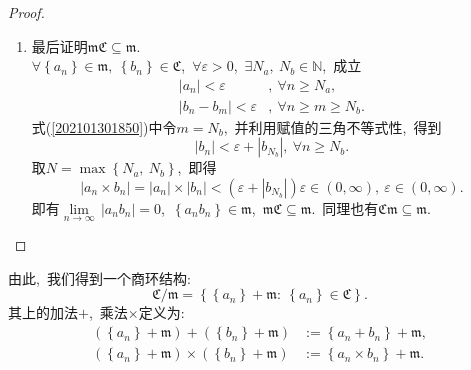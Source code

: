 \documentclass[UTF8, twoside]{ctexart}
\theoremstyle{nonumberplain}
\newtheorem{proof}{\heiti 证明}  %
\theoremstyle{nonumberplain}
\theoremstyle{plain}
\begin{document}
\begin{proof}
\begin{enumerate}
			\item 最后证明$\mathfrak{m}\mathfrak{C}\subseteq \mathfrak{m}$.\ \\
			$\forall \left\{ {{a}_{n}} \right\}\in \mathfrak{m},\ \left\{ {{b}_{n}} \right\}\in \mathfrak{C}$,\ $\forall \varepsilon >0$,\ $\exists {{N}_{a}},\ {{N}_{b}}\in \mathbb{N}$,\ 成立
			\begin{subequations}
				\begin{align}
					\left| {{a}_{n}} \right|<\varepsilon &,\ \forall n\ge {{N}_{a}}, \\ 
					\left| {{b}_{n}}-{{b}_{m}} \right|<\varepsilon &,\ \forall n\ge m\ge {{N}_{b}}.  \label{202101301850}
				\end{align}
			\end{subequations}
			式(\ref{202101301850})中令$m={{N}_{b}}$,\ 
			并利用赋值的三角不等式性,\ 得到
			\[
				\left| {{b}_{n}} \right|<\varepsilon +\left| {{b}_{{{N}_{b}}}} \right|,
				\ \forall n\ge {{N}_{b}}.
			\]
			取$N=\max \left\{ {{N}_{a}},\ {{N}_{b}} \right\}$,\ 即得
			\[
				\left| {{a}_{n}}\times {{b}_{n}} \right|=\left| {{a}_{n}} \right|\times \left| {{b}_{n}} \right|<\left( \varepsilon +\left| {{b}_{{{N}_{b}}}} \right| \right)\varepsilon \in \left( 0,\infty  \right),\ \varepsilon \in \left( 0,\infty  \right).
			\]
			即有$\underset{n\to \infty }{\mathop{\lim }}\,\left| {{a}_{n}}{{b}_{n}} \right|=0$,\ $\left\{ {{a}_{n}}{{b}_{n}} \right\}\in \mathfrak{m}$,\ $\mathfrak{m}\mathfrak{C}\subseteq \mathfrak{m}$.\ 同理也有$\mathfrak{C}\mathfrak{m}\subseteq \mathfrak{m}$.
		\end{enumerate}
	\end{proof}
	\vskip 0.5cm
	
	由此,\ 我们得到一个商环结构:\ 
	\[
		\mathfrak{C}/\mathfrak{m}=\left\{ \left\{ {{a}_{n}} \right\}+\mathfrak{m}:\ \left\{ {{a}_{n}} \right\}\in \mathfrak{C} \right\}.
	\]
	其上的加法$+$,\ 乘法$\times$定义为:\ 
	\begin{align*}
		\left( \left\{ {{a}_{n}} \right\}+\mathfrak{m} \right)+\left( \left\{ {{b}_{n}} \right\}+\mathfrak{m} \right)&:=\left\{ {{a}_{n}}+{{b}_{n}} \right\}+\mathfrak{m}, \\ 
		\left( \left\{ {{a}_{n}} \right\}+\mathfrak{m} \right)\times \left( \left\{ {{b}_{n}} \right\}+\mathfrak{m} \right)&:=\left\{ {{a}_{n}}\times {{b}_{n}} \right\}+\mathfrak{m}.
	\end{align*}
	\vskip 0.5cm
	
\end{document}
